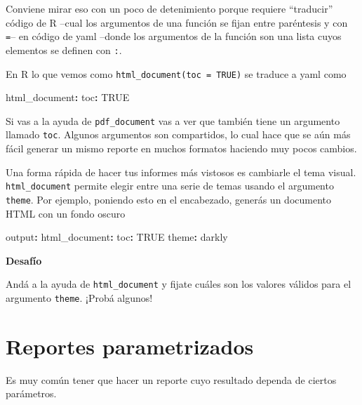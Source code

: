 \documentclass[
  openany]{book}
\newenvironment{Shaded}{\begin{snugshade}}{\end{snugshade}}
\newcommand{\AttributeTok}[1]{\textcolor[rgb]{0.77,0.63,0.00}{#1}}
\newcommand{\CharTok}[1]{\textcolor[rgb]{0.31,0.60,0.02}{#1}}
\newcommand{\FunctionTok}[1]{\textcolor[rgb]{0.00,0.00,0.00}{#1}}
\newcommand{\KeywordTok}[1]{\textcolor[rgb]{0.13,0.29,0.53}{\textbf{#1}}}
\begin{document}
Conviene mirar eso con un poco de detenimiento porque requiere ``traducir'' código de R --cual los argumentos de una función se fijan entre paréntesis y con \texttt{=}-- en código de yaml --donde los argumentos de la función son una lista cuyos elementos se definen con \texttt{:}.

En R lo que vemos como \texttt{html\_document(toc\ =\ TRUE)} se traduce a yaml como

\begin{Shaded}
\begin{Highlighting}[]
\FunctionTok{html\_document}\KeywordTok{:}
\AttributeTok{  }\FunctionTok{toc}\KeywordTok{:}\AttributeTok{ }\CharTok{TRUE}
\end{Highlighting}
\end{Shaded}

Si vas a la ayuda de \texttt{pdf\_document} vas a ver que también tiene un argumento llamado \texttt{toc}. Algunos argumentos son compartidos, lo cual hace que se aún más fácil generar un mismo reporte en muchos formatos haciendo muy pocos cambios.

Una forma rápida de hacer tus informes más vistosos es cambiarle el tema visual. \texttt{html\_document} permite elegir entre una serie de temas usando el argumento \texttt{theme}. Por ejemplo, poniendo esto en el encabezado, generás un documento HTML con un fondo oscuro

\begin{Shaded}
\begin{Highlighting}[]
\FunctionTok{output}\KeywordTok{:}\AttributeTok{ }
\AttributeTok{  }\FunctionTok{html\_document}\KeywordTok{:}
\AttributeTok{    }\FunctionTok{toc}\KeywordTok{:}\AttributeTok{ }\CharTok{TRUE}
\AttributeTok{    }\FunctionTok{theme}\KeywordTok{:}\AttributeTok{ darkly}
\end{Highlighting}
\end{Shaded}

\textbf{Desafío}

Andá a la ayuda de \texttt{html\_document} y fijate cuáles son los valores válidos para el argumento \texttt{theme}. ¡Probá algunos!

\hypertarget{reportes-parametrizados}{%
\section{Reportes parametrizados}\label{reportes-parametrizados}}

Es muy común tener que hacer un reporte cuyo resultado dependa de ciertos parámetros.
\end{document}
